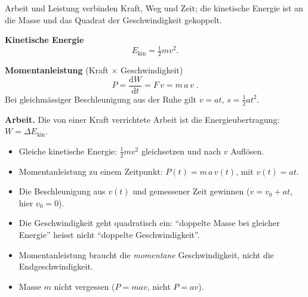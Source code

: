 

Arbeit und Leistung verbinden Kraft, Weg und Zeit; die kinetische Energie
ist an die Masse und das Quadrat der Geschwindigkeit gekoppelt.

\begin{werkzeugkasten}[Werkzeuge]
\textbf{Kinetische Energie}
\begin{equation}
  E_{\mathrm{kin}}=\tfrac12 m v^2.
\end{equation}

\textbf{Momentanleistung} (Kraft $\times$ Geschwindigkeit)
\begin{equation}
  P=\frac{\mathrm dW}{\mathrm dt}=F\,v=m\,a\,v\;.
\end{equation}
Bei gleichmässiger Beschleunigung aus der Ruhe gilt
$v=at$, $s=\tfrac12 at^2$.

\textbf{Arbeit.} Die von einer Kraft verrichtete Arbeit ist die
Energieubertragung: $W=\Delta E_{\mathrm{kin}}$.
\end{werkzeugkasten}

\begin{werkzeugkasten}[Vorgehen]
\begin{itemize}
  \item Gleiche kinetische Energie: $\tfrac12 m v^2$ gleichsetzen und nach
        $v$ Auflösen.
  \item Momentanleistung zu einem Zeitpunkt: $P(t)=m\,a\,v(t)$, mit
        $v(t)=at$.
  \item Die Beschleunigung aus $v(t)$ und gemessener Zeit gewinnen
        ($v=v_0+at$, hier $v_0=0$).
\end{itemize}
\end{werkzeugkasten}

\begin{achtung}
\begin{itemize}
  \item Die Geschwindigkeit geht quadratisch ein: ``doppelte Masse bei
        gleicher Energie'' heisst nicht ``doppelte Geschwindigkeit''.
  \item Momentanleistung braucht die \emph{momentane} Geschwindigkeit,
        nicht die Endgeschwindigkeit.
  \item Masse $m$ nicht vergessen ($P=mav$, nicht $P=av$).
\end{itemize}
\end{achtung}
